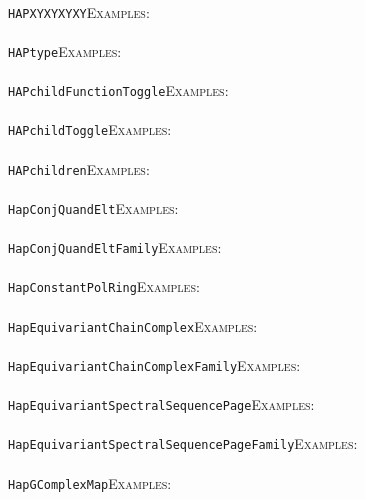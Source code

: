 \documentclass[a4paper,11pt]{report}
\begin{document}
{{ \\
 \texttt{HAP{\textunderscore}XYXYXYXY}{\nobreakspace}{\nobreakspace}{\nobreakspace}{\nobreakspace}\textsc{Examples:} \\
 \\
 \texttt{HAP{\textunderscore}type}{\nobreakspace}{\nobreakspace}{\nobreakspace}{\nobreakspace}\textsc{Examples:} \\
 \\
 \texttt{HAPchildFunctionToggle}{\nobreakspace}{\nobreakspace}{\nobreakspace}{\nobreakspace}\textsc{Examples:} \\
 \\
 \texttt{HAPchildToggle}{\nobreakspace}{\nobreakspace}{\nobreakspace}{\nobreakspace}\textsc{Examples:} \\
 \\
 \texttt{HAPchildren}{\nobreakspace}{\nobreakspace}{\nobreakspace}{\nobreakspace}\textsc{Examples:} \\
 \\
 \texttt{HapConjQuandElt}{\nobreakspace}{\nobreakspace}{\nobreakspace}{\nobreakspace}\textsc{Examples:} \\
 \\
 \texttt{HapConjQuandEltFamily}{\nobreakspace}{\nobreakspace}{\nobreakspace}{\nobreakspace}\textsc{Examples:} \\
 \\
 \texttt{HapConstantPolRing}{\nobreakspace}{\nobreakspace}{\nobreakspace}{\nobreakspace}\textsc{Examples:} \\
 \\
 \texttt{HapEquivariantChainComplex}{\nobreakspace}{\nobreakspace}{\nobreakspace}{\nobreakspace}\textsc{Examples:} \\
 \\
 \texttt{HapEquivariantChainComplexFamily}{\nobreakspace}{\nobreakspace}{\nobreakspace}{\nobreakspace}\textsc{Examples:} \\
 \\
 \texttt{HapEquivariantSpectralSequencePage}{\nobreakspace}{\nobreakspace}{\nobreakspace}{\nobreakspace}\textsc{Examples:} \\
 \\
 \texttt{HapEquivariantSpectralSequencePageFamily}{\nobreakspace}{\nobreakspace}{\nobreakspace}{\nobreakspace}\textsc{Examples:} \\
 \\
 \texttt{HapGComplexMap}{\nobreakspace}{\nobreakspace}{\nobreakspace}{\nobreakspace}\textsc{Examples:} \\
 \\
}}
\end{document}
